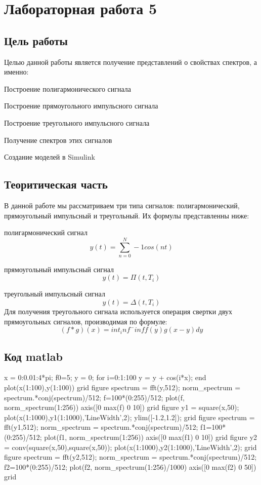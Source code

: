 \documentclass[10pt,a4paper]{report}
\begin{document}
\chapter{Лабораторная работа 5}
\section{Цель работы}
Целью данной работы является получение представлений о свойствах спектров, а именно:
\item Построение полигармонического сигнала
\item Построение прямоугольного импульсного сигнала
\item Построение треугольного импульсного сигнала
\item Получение спектров этих сигналов
\item Создание моделей в Simulink
\section{Теоритическая часть}
В данной работе мы рассматриваем три типа сигналов: полигармонический, прямоугольный импульсный и треугольный. Их формулы представленны ниже:
\item полигармонический сигнал 
\begin{displaymath}
y(t) = \sum_{n=0}^N-1 cos(nt)
\end{displaymath}
\item прямоугольный импульсный сигнал
\begin{displaymath}
y(t) = \Pi (t,T_i)
\end{displaymath}
\item треугольный импульсный сигнал
\begin{displaymath}
y(t) = \Delta (t,T_i)
\end{displaymath}
Для получения треугольного сигнала используется операция свертки двух прямоугольных сигналов, производимая по формуле:
\begin{displaymath}
(f*g)(x) = int_inf^-inf f(y)g(x-y)dy
\end{displaymath}
\section{Код matlab}
x = 0:0.01:4*pi;
f0=5;
y = 0;
for i=0:1:100
    y = y + cos(i*x);
end 
plot(x(1:100),y(1:100))
grid
figure
spectrum = fft(y,512);
norm_spectrum = spectrum.*conj(spectrum)/512;
f=100*(0:255)/512;
plot(f, norm_spectrum(1:256))
axis([0 max(f) 0 10])
grid
figure
y1 = square(x,50);
plot(x(1:1000),y1(1:1000),'LineWidth',2);
ylim([-1.2,1.2]);
grid
figure
spectrum = fft(y1,512);
norm_spectrum = spectrum.*conj(spectrum)/512;
f1=100*(0:255)/512;
plot(f1, norm_spectrum(1:256))
axis([0 max(f1) 0 10])
grid
figure
y2 = conv(square(x,50),square(x,50));
plot(x(1:1000),y2(1:1000),'LineWidth',2);
grid
figure
spectrum = fft(y2,512);
norm_spectrum = spectrum.*conj(spectrum)/512;
f2=100*(0:255)/512;
plot(f2, norm_spectrum(1:256)/1000)
axis([0 max(f2) 0 50])
grid
\end{document}
